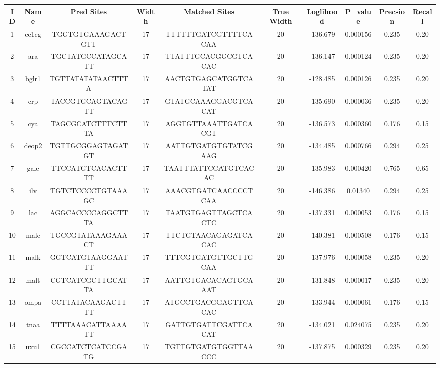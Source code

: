 \documentclass{article}
\begin{document}
\begin{table}
\begin{tabular}{c|c|c|c|c|c|c|c|c|c}
\toprule
 ID &     Name &         Pred Sites & Width &            Matched Sites & True Width &  Loglihood &   P\_value &  Precsion &  Recall \\
\midrule
   1 &    ce1cg &  TGGTGTGAAAGACTGTT &    17 &  TTTTTTGATCGTTTTCACAA &         20 &   -136.679 &  0.000156 &     0.235 &    0.20 \\
  2 &      ara &  TGCTATGCCATAGCATT &    17 &  TTATTTGCACGGCGTCACAC &         20 &   -136.147 &  0.000124 &     0.235 &    0.20 \\
  3 &    bglr1 &  TGTTATATATAACTTTA &    17 &  AACTGTGAGCATGGTCATAT &         20 &   -128.485 &  0.000126 &     0.235 &    0.20 \\
  4 &      crp &  TACCGTGCAGTACAGTT &    17 &  GTATGCAAAGGACGTCACAT &         20 &   -135.690 &  0.000036 &     0.235 &    0.20 \\
  5 &      cya &  TAGCGCATCTTTCTTTA &    17 &  AGGTGTTAAATTGATCACGT &         20 &   -136.573 &  0.000360 &     0.176 &    0.15 \\
  6 &    deop2 &  TGTTGCGGAGTAGATGT &    17 &  AATTGTGATGTGTATCGAAG &         20 &   -134.485 &  0.000766 &     0.294 &    0.25 \\
  7 &     gale &  TTCCATGTCACACTTTT &    17 &  TAATTTATTCCATGTCACAC &         20 &   -135.983 &  0.000420 &     0.765 &    0.65 \\
  8 &      ilv &  TGTCTCCCCTGTAAAGC &    17 &  AAACGTGATCAACCCCTCAA &         20 &   -146.386 &  0.01340 &     0.294 &    0.25 \\
  9 &      lac &  AGGCACCCCAGGCTTTA &    17 &  TAATGTGAGTTAGCTCACTC &         20 &   -137.331 &  0.000053 &     0.176 &    0.15 \\
 10 &     male &  TGCCGTATAAAGAAACT &    17 &  TTCTGTAACAGAGATCACAC &         20 &   -140.381 &  0.000508 &     0.176 &    0.15 \\
 11 &     malk &  GGTCATGTAAGGAATTT &    17 &  TTTCGTGATGTTGCTTGCAA &         20 &   -137.976 &  0.000058 &     0.235 &    0.20 \\
 12 &     malt &  CGTCATCGCTTGCATTA &    17 &  AATTGTGACACAGTGCAAAT &         20 &   -131.848 &  0.000017 &     0.235 &    0.20 \\
 13 &     ompa &  CCTTATACAAGACTTTT &    17 &  ATGCCTGACGGAGTTCACAC &         20 &   -133.944 &  0.000061 &     0.176 &    0.15 \\
 14 &     tnaa &  TTTTAAACATTAAAATT &    17 &  GATTGTGATTCGATTCACAT &         20 &   -134.021 &  0.024075 &     0.235 &    0.20 \\
 15 &     uxu1 &  CGCCATCTCATCCGATG &    17 &  TGTTGTGATGTGGTTAACCC &         20 &   -137.875 &  0.000329 &     0.235 &    0.20 \\

\end{tabular}
\end{table}
\end{document}
